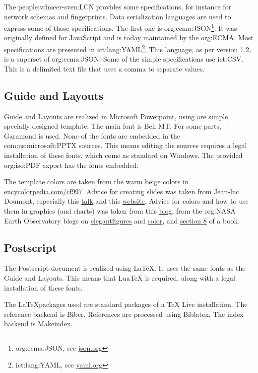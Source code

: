     The \ac{people:vdmeer-sven:LCN} provides some specifications, for instance for network schemas and fingerprints.
    Data serialization languages are used to express some of those specifications.
    The first one is \acs{org:ecma:JSON}\footnote{\ac{org:ecma:JSON}, see \href{https://www.json.org/}{json.org}}.
        It was originally defined for JavaScript and is today maintained by the \acs{org:ECMA}.
    Most specifications are presented in \acs{ict:lang:YAML}\footnote{\ac{ict:lang:YAML}, see \href{https://yaml.org/}{yaml.org}}.
        This language, as per version 1.2, is a superset of \ac{org:ecma:JSON}.
    Some of the simple specifications use \ac{ict:CSV}.
        This is a delimited text file that uses a comma to separate values.


\subsection{Guide and Layouts}
    Guide and Layouts are realized in Microsoft Powerpoint, using are simple, specially designed template.
    The main font is Bell MT.
    For some parts, Garamond is used.
    None of the fonts are embedded in the \acs{com:us:microsoft:PPTX} sources.
    This means editing the sources requires a legal installation of these fonts, which come as standard on Windows.
    The provided \acs{org:iso:PDF} export has the fonts embedded.

    The template colors are taken from the warm beige colors in \href{https://encycolorpedia.com/cfb997}{encycolorpedia.com/cf997}.
    Advice for creating slides was taken from Jean-luc Doumont, especially this \href{https://www.youtube.com/watch?v=meBXuTIPJQk}{talk}
        and this \href{http://www.principiae.be/X0800.php}{website}.
    Advice for colors and how to use them in graphics (and charts) was taken from
        this \href{https://medium.com/@Elijah_Meeks/color-advice-for-data-visualization-with-d3-js-33b5adc41c90}{blog},
        from the \acs{org:NASA} Earth Observatory blogs on \href{https://earthobservatory.nasa.gov/blogs/elegantfigures/}{elegantfigures} and \href{https://earthobservatory.nasa.gov/blogs/elegantfigures/category/color/}{color}, and
        \href{https://socviz.co/refineplots.html}{section 8} of a book.


\subsection{Postscript}
    The Postscript document is realized using \LaTeX.
    It uses the same fonts as the Guide and Layouts.
    This means that LuaTeX is required, along with a legal installation of these fonts.

    The \LaTeX packages used are standard packages of a TeX Live installation.
    The reference backend is Biber.
    References are processed using Biblatex.
    The index backend is Makeindex.

